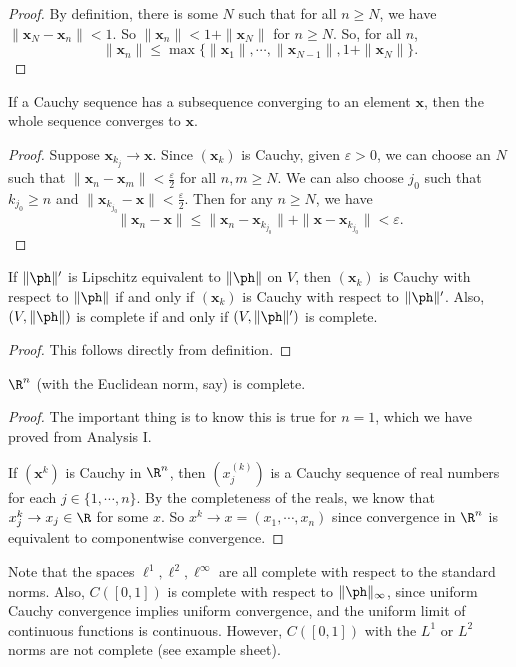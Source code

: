 \documentclass[a4paper]{article}
\begin{document}
\begin{proof}
  By definition, there is some $N$ such that for all $n \geq N$, we have $\|\mathbf{x}_N - \mathbf{x}_n\| < 1$. So $\|\mathbf{x}_n\| < 1 + \|\mathbf{x}_N\|$ for $n \geq N$. So, for all $n$,
  \[
    \|\mathbf{x}_n\| \leq \max\{\|\mathbf{x}_1\|, \cdots, \|\mathbf{x}_{N - 1}\|, 1 + \|\mathbf{x}_N\|\}.
  \]
\end{proof}

\begin{prop}
  If a Cauchy sequence has a subsequence converging to an element $\mathbf{x}$, then the whole sequence converges to $\mathbf{x}$.
\end{prop}

\begin{proof}
  Suppose $\mathbf{x}_{k_j} \to \mathbf{x}$. Since $(\mathbf{x}_k)$ is Cauchy, given $\varepsilon > 0$, we can choose an $N$ such that $\|\mathbf{x}_n - \mathbf{x}_m\| < \frac{\varepsilon}{2}$ for all $n, m \geq N$. We can also choose $j_0$ such that $k_{j_0} \geq n$ and $\|\mathbf{x}_{k_{j_0}} - \mathbf{x}\| < \frac{\varepsilon}{2}$. Then for any $n \geq N$, we have
  \[
    \|\mathbf{x}_n - \mathbf{x}\| \leq \|\mathbf{x}_n - \mathbf{x}_{k_{j_0}}\| + \|\mathbf{x} - \mathbf{x}_{k_{j_0}}\| < \varepsilon.
  \]
\end{proof}

\begin{prop}
  If $\|\ph \|'$ is Lipschitz equivalent to $\|\ph\|$ on $V$, then $(\mathbf{x}_k)$ is Cauchy with respect to $\|\ph \|$ if and only if $(\mathbf{x}_k)$ is Cauchy with respect to $\|\ph\|'$. Also, $(V, \|\ph\|)$ is complete if and only if $(V, \|\ph\|')$ is complete.
\end{prop}

\begin{proof}
  This follows directly from definition.
\end{proof}

\begin{thm}
  $\R^n$ (with the Euclidean norm, say) is complete.
\end{thm}

\begin{proof}
  The important thing is to know this is true for $n = 1$, which we have proved from Analysis I.

  If $(\mathbf{x}^k)$ is Cauchy in $\R^n$, then $(x_j^{(k)})$ is a Cauchy sequence of real numbers for each $j \in \{1, \cdots, n\}$. By the completeness of the reals, we know that $x_j^k \to x_j \in \R$ for some $x$. So $x^k \to x = (x_1, \cdots, x_n)$ since convergence in $\R^n$ is equivalent to componentwise convergence.
\end{proof}
Note that the spaces $\ell^1, \ell^2, \ell^\infty$ are all complete with respect to the standard norms. Also, $C([0, 1])$ is complete with respect to $\|\ph\|_\infty$, since uniform Cauchy convergence implies uniform convergence, and the uniform limit of continuous functions is continuous. However, $C([0, 1])$ with the $L^1$ or $L^2$ norms are not complete (see example sheet).
\end{document}

